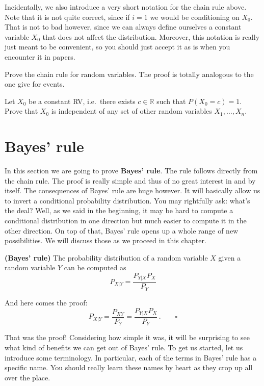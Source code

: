 Incidentally, we also introduce a very short notation for the chain rule above. Note that it is not quite correct, since if
$ i = 1 $ we would be conditioning on $ X_{0} $. That is not to bad however, since we can always define ourselves a constant variable $ X_{0} $ that does not affect the distribution. Moreover, this notation is really just meant to be convenient, so you should just accept it as is when you encounter it in papers.

\begin{Exercise}
Prove the chain rule for random variables. The proof is totally analogous to the one give for events.
\end{Exercise}

\begin{Exercise}
Let $X_0$ be a constant RV, i.e.\ there exists $c \in \mathbb{R}$ such that $P(X_0 = c)=1$. 
Prove that $X_0$ is independent of any set of other random variables $X_1,\ldots,X_n$.
\end{Exercise}

\section{Bayes' rule}

In this section we are going to prove \textbf{Bayes' rule}. The rule follows directly from the chain rule.
The proof is really simple and thus of no great interest in and by itself. The consequences of Bayes' rule
are huge however. It will basically allow us to invert a conditional probability distribution. You may rightfully
ask: what's the deal? Well, as we said in the beginning, it may be hard to compute a conditional distribution in one
direction but much easier to compute it in the other direction. On top of that, Bayes' rule opens up a whole range of new possibilities. We will discuss those as we proceed in this chapter.
\begin{Theorem}{\textbf{(Bayes' rule)}}
The probability distribution of a random variable $ X $ given a random variable $ Y $ can be computed as
$$ P_{X|Y} = \dfrac{P_{Y|X}P_{X}}{P_{Y}} $$
\end{Theorem}

And here comes the proof:
\begin{equation}
P_{X|Y} = \dfrac{P_{XY}}{P_{Y}} = \dfrac{P_{Y|X}P_{X}}{P_{Y}} \, . \qquad  \square
\end{equation}

That was the proof! Considering how simple it was, it will be surprising to see what kind of benefits we can get out
of Bayes' rule. To get us started, let us introduce some terminology. In particular, each of the terms
in Bayes' rule has a specific name. You should really learn these names by heart as they crop up all over the place.


